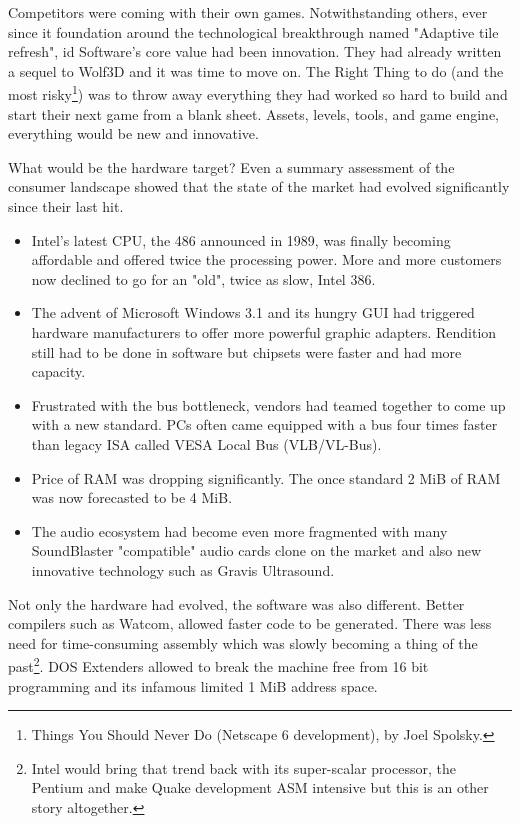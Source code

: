 Competitors were coming with their own games. Notwithstanding others, ever since it foundation around the technological breakthrough named "Adaptive tile refresh", id Software's core value had been innovation. They had already written a sequel to Wolf3D and it was time to move on. The Right Thing to do (and the most risky\footnote{Things You Should Never Do (Netscape 6 development), by Joel Spolsky.}) was to throw away everything they had worked so hard to build and start their next game from a blank sheet. Assets, levels, tools, and game engine, everything would be new and innovative.\\
\par
What would be the hardware target? Even a summary assessment of the consumer landscape showed that the state of the market had evolved significantly since their last hit.\\
\begin{itemize}
\item Intel's latest CPU, the 486 announced in 1989, was finally becoming affordable and offered twice the processing power. More and more customers now declined to go for an "old", twice as slow, Intel 386. 
\item The advent of Microsoft Windows 3.1 and its hungry GUI had triggered hardware manufacturers to offer more powerful graphic adapters. Rendition still had to be done in software but chipsets were faster and had more capacity.
\item Frustrated with the bus bottleneck, vendors had teamed together to come up with a new standard. PCs often came equipped with a bus four times faster than legacy ISA called VESA Local Bus (VLB/VL-Bus). 
\item Price of RAM was dropping significantly. The once standard 2 MiB of RAM was now forecasted to be 4 MiB. 
\item The audio ecosystem had become even more fragmented with many SoundBlaster "compatible" audio cards clone on the market and also new innovative technology such as Gravis Ultrasound.\\
\end{itemize}
 \par 
 Not only the hardware had evolved, the software was also different. Better compilers such as Watcom, allowed faster code to be generated. There was less need for time-consuming assembly which was slowly becoming a thing of the past\footnote{Intel would bring that trend back with its super-scalar processor, the Pentium and make Quake development ASM intensive but this is an other story altogether.}. DOS Extenders allowed to break the machine free from 16 bit programming and its infamous limited 1 MiB address space.\\
